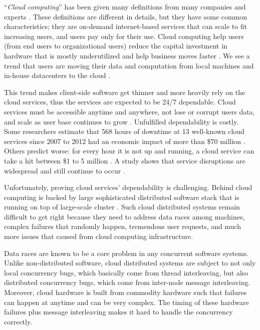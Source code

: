 ``\textit{Cloud computing}'' has been given many definitions from many companies
and experts \cite{TwentyoneCloudDef, IBMCloudDef, PCMagCloudDef,
Foster+08-CloudAndGrid}. These definitions are different in details, but they
have some common characteristics; they are on-demand internet-based services
that can scale to fit increasing users, and users pay only for their use.
%
Cloud computing help users (from end users to organizational users) reduce the
capital investment in hardware that is mostly underutilized
\cite{Hayes+08-CloudComputing} and help business moves faster
\cite{Marston+11-CloudBusiness}. We see a trend that users are moving their data
and computation from local machines and in-house datacenters to the cloud
\cite{AdobeCloudStat, AWSCustomer, GmailStat, GoogleDriveStat, DropboxStat,
AstroInCloud, FacebookStat, Luo+16-BigDataBioResearch}.

This trend makes client-side software get thinner and more heavily rely on the
cloud services, thus the services are expected to be 24/7 dependable. Cloud
services must be accessible anytime and anywhere, not lose or corrupt users
data, and scale as user base continues to grow \cite{Buyya+09-Cloud5thUtil}.
%
Unfulfilled dependability is costly. Some researchers estimate that 568 hours of
downtime at 13 well-known cloud services since 2007 to 2012 had an economic
impact of more than \$70 million \cite{Essers12-70Million}. Others predict
worse: for every hour it is not up and running, a cloud service can take a hit
between \$1 to 5 million \cite{Linthicum13-InfoworldCostOutages}. A study shows
that service disruptions are widespread and still continue to occur
\cite{Gunawi+16-COS}.

Unfortunately, proving cloud services' dependability is challenging. Behind 
cloud computing is backed by large sophisticated distributed software stack
\cite{Burrows06-Chubby, Chang+06-BigTable, Chapin+95-Hive, Corbett+12-Spanner,
DeanGhemawat04-MapReduce, DeCandia+07-Dynamo, Ghemawat+03-GoogleFS,
Hunt+10-ZooKeeperPaper, Lakshman+09-Cassandra, Melnik+10-DremelInteractive,
Zaharia+12-RDD} that is running on top of large-scale cluster
\cite{WikiCassandra, RunningNetflix13, LargestHadoop}.  Such cloud distributed
systems remain difficult to get right because they need to address data races
among machines, complex failures that randomly happen, tremendous user
requests, and much more issues that caused from cloud computing infrastructure.

Data races are known to be a core problem in any concurrent software systems.
Unlike non-distributed software, cloud distributed systems are subject to not
only local concurrency bugs, which basically come from thread interleaving, but
also distributed concurrency bugs, which come from inter-node message
interleaving.  Moreover, cloud hardware is built from commodity hardware such
that failures can happen at anytime and can be very complex. The timing of these
hardware failures plus message interleaving makes it hard to handle the
concurrency correctly.

